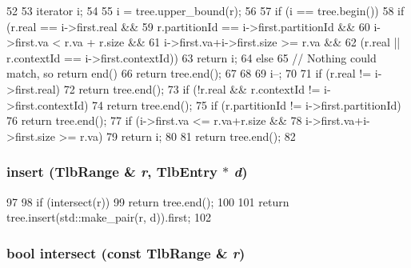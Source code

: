 \begin{DoxyCode}
52     {
53         iterator i;
54 
55         i = tree.upper_bound(r);
56 
57         if (i == tree.begin()) {
58             if (r.real == i->first.real &&
59                 r.partitionId == i->first.partitionId &&
60                 i->first.va < r.va + r.size &&
61                 i->first.va+i->first.size >= r.va &&
62                 (r.real || r.contextId == i->first.contextId))
63                 return i;
64             else
65                 // Nothing could match, so return end()
66                 return tree.end();
67         }
68 
69         i--;
70 
71         if (r.real != i->first.real)
72             return tree.end();
73         if (!r.real && r.contextId != i->first.contextId)
74             return tree.end();
75         if (r.partitionId != i->first.partitionId)
76             return tree.end();
77         if (i->first.va <= r.va+r.size &&
78             i->first.va+i->first.size >= r.va)
79             return i;
80 
81         return tree.end();
82     }
\end{DoxyCode}
\hypertarget{classSparcISA_1_1TlbMap_a66f7339d1c0cbb7021619a0011102afc}{
\subsubsection[{insert}]{ insert ({\bf TlbRange} \& {\em r}, \/  {\bf TlbEntry} $\ast$ {\em d})}}
\label{classSparcISA_1_1TlbMap_a66f7339d1c0cbb7021619a0011102afc}



\begin{DoxyCode}
97     {
98         if (intersect(r))
99             return tree.end();
100 
101         return tree.insert(std::make_pair(r, d)).first;
102     }
\end{DoxyCode}
\hypertarget{classSparcISA_1_1TlbMap_a61c6ed5976ad034997bfe6e12975e1d6}{
\subsubsection[{intersect}]{\setlength{\rightskip}{0pt plus 5cm}bool intersect (const {\bf TlbRange} \& {\em r})}}
\label{classSparcISA_1_1TlbMap_a61c6ed5976ad034997bfe6e12975e1d6}



